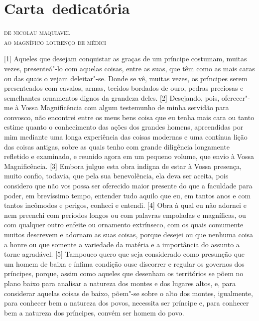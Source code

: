 \setcounter{secnumdepth}{-2}
\setcounter{paragraph}{0}

\section{Carta~dedicatória}

\noindent\textsc{de nicolau maquiavel\\ ao magnífico lourenço de médici}

{[}1{]} Aqueles que desejam conquistar as graças de um príncipe
costumam, muitas vezes, presenteá"-lo com aquelas coisas, entre as suas,
que têm como as mais caras ou das quais o vejam deleitar"-se. Donde se
vê, muitas vezes, os príncipes serem presenteados com cavalos, armas,
tecidos bordados de ouro, pedras preciosas e semelhantes ornamentos
dignos da grandeza deles. {[}2{]} Desejando, pois, oferecer"-me à Vossa
Magnificência com algum testemunho de minha servidão para convosco, não
encontrei entre os meus bens coisa que eu tenha mais cara ou tanto
estime quanto o conhecimento das ações dos grandes homens, apreendidas
por mim mediante uma longa experiência das coisas modernas e uma
contínua lição das coisas antigas, sobre as quais tenho com grande
diligência longamente refletido e examinado, e reunido agora em um
pequeno volume, que envio à Vossa Magnificência. {[}3{]} Embora julgue
esta obra indigna de estar à Vossa presença, muito confio, todavia, que
pela sua benevolência, ela deva ser aceita, pois considero que não vos
possa ser oferecido maior presente do que a faculdade para poder, em
brevíssimo tempo, entender tudo aquilo que eu, em tantos anos e com
tantos incômodos e perigos, conheci e entendi. {[}4{]} Obra à qual eu não adornei e nem preenchi com
períodos longos ou com palavras empoladas e magníficas, ou com qualquer
outro enfeite ou ornamento extrínseco, com os quais comumente muitos
descrevem e adornam as suas coisas, porque desejei ou que nenhuma coisa
a honre ou que somente a variedade da matéria e a importância do assunto
a torne agradável. {[}5{]} Tampouco quero que seja considerado como
presunção que um homem de baixa e ínfima condição ouse discorrer e
regular os governos dos príncipes, porque, assim como aqueles que
desenham os territórios se põem no plano baixo para analisar a natureza
dos montes e dos lugares altos, e, para considerar aquelas coisas de
baixo, põem"-se sobre o alto dos montes, igualmente, para conhecer bem a
natureza dos povos, necessita ser príncipe e, para conhecer bem a
natureza dos príncipes, convém ser homem do povo.

